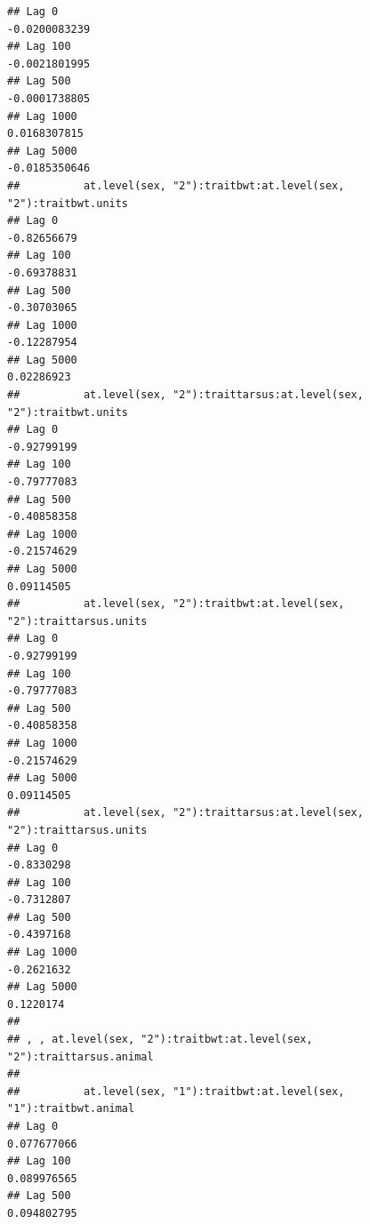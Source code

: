 \documentclass[
  12pt,
]{book}
\begin{document}
\begin{verbatim}
## Lag 0                                                          -0.0200083239
## Lag 100                                                        -0.0021801995
## Lag 500                                                        -0.0001738805
## Lag 1000                                                        0.0168307815
## Lag 5000                                                       -0.0185350646
##          at.level(sex, "2"):traitbwt:at.level(sex, "2"):traitbwt.units
## Lag 0                                                      -0.82656679
## Lag 100                                                    -0.69378831
## Lag 500                                                    -0.30703065
## Lag 1000                                                   -0.12287954
## Lag 5000                                                    0.02286923
##          at.level(sex, "2"):traittarsus:at.level(sex, "2"):traitbwt.units
## Lag 0                                                         -0.92799199
## Lag 100                                                       -0.79777083
## Lag 500                                                       -0.40858358
## Lag 1000                                                      -0.21574629
## Lag 5000                                                       0.09114505
##          at.level(sex, "2"):traitbwt:at.level(sex, "2"):traittarsus.units
## Lag 0                                                         -0.92799199
## Lag 100                                                       -0.79777083
## Lag 500                                                       -0.40858358
## Lag 1000                                                      -0.21574629
## Lag 5000                                                       0.09114505
##          at.level(sex, "2"):traittarsus:at.level(sex, "2"):traittarsus.units
## Lag 0                                                             -0.8330298
## Lag 100                                                           -0.7312807
## Lag 500                                                           -0.4397168
## Lag 1000                                                          -0.2621632
## Lag 5000                                                           0.1220174
## 
## , , at.level(sex, "2"):traitbwt:at.level(sex, "2"):traittarsus.animal
## 
##          at.level(sex, "1"):traitbwt:at.level(sex, "1"):traitbwt.animal
## Lag 0                                                       0.077677066
## Lag 100                                                     0.089976565
## Lag 500                                                     0.094802795

\end{verbatim}
\end{document}
